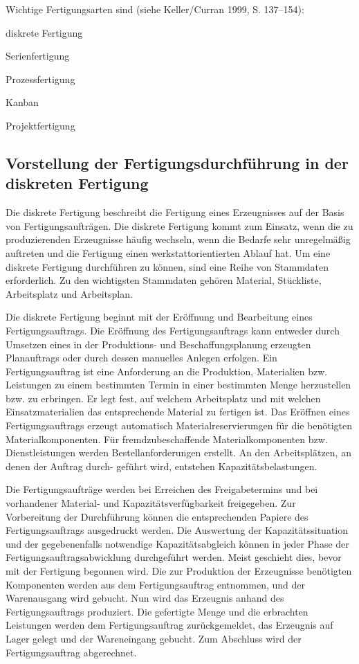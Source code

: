 Wichtige Fertigungsarten sind (siehe Keller/Curran 1999, S. 137–154): 

diskrete Fertigung 

Serienfertigung 

Prozessfertigung 

Kanban 

Projektfertigung



\subsection{Vorstellung der Fertigungsdurchführung in der diskreten Fertigung}


Die diskrete Fertigung  beschreibt die Fertigung eines Erzeugnisses auf der Basis von Fertigungsaufträgen. Die diskrete Fertigung kommt zum Einsatz, wenn die zu produzierenden Erzeugnisse häufig wechseln, wenn die Bedarfe sehr unregelmäßig auftreten und die Fertigung einen werkstattorientierten Ablauf hat. Um eine diskrete Fertigung durchführen zu können, sind eine Reihe von Stammdaten erforderlich. Zu den wichtigsten Stammdaten gehören Material, Stückliste, Arbeitsplatz und Arbeitsplan.

Die diskrete Fertigung beginnt mit der Eröffnung und Bearbeitung eines Fertigungsauftrags. Die Eröffnung des Fertigungsauftrags kann entweder durch Umsetzen eines in der Produktions- und Beschaffungsplanung erzeugten Planauftrags oder durch dessen manuelles Anlegen erfolgen. Ein Fertigungsauftrag ist eine Anforderung an die Produktion, Materialien bzw. Leistungen zu einem bestimmten Termin in einer bestimmten Menge herzustellen bzw. zu erbringen. Er legt fest, auf welchem Arbeitsplatz und mit welchen Einsatzmaterialien das entsprechende Material zu fertigen ist. Das Eröffnen eines Fertigungsauftrags erzeugt automatisch Materialreservierungen für die benötigten Materialkomponenten. Für fremdzubeschaffende Materialkomponenten bzw. Dienstleistungen werden Bestellanforderungen erstellt. An den Arbeitsplätzen, an denen der Auftrag durch- geführt wird, entstehen Kapazitätsbelastungen.

Die Fertigungsaufträge werden bei Erreichen des Freigabetermins und bei vorhandener Material- und Kapazitätsverfügbarkeit freigegeben. Zur Vorbereitung der Durchführung können die entsprechenden Papiere des Fertigungsauftrags ausgedruckt werden. Die Auswertung der Kapazitätssituation und der gegebenenfalls notwendige Kapazitätsabgleich können in jeder Phase der Fertigungsauftragsabwicklung durchgeführt werden. Meist geschieht dies, bevor mit der Fertigung begonnen wird. Die zur Produktion der Erzeugnisse benötigten Komponenten werden aus dem Fertigungsauftrag entnommen, und der Warenausgang wird gebucht. Nun wird das Erzeugnis anhand des Fertigungsauftrags produziert. Die gefertigte Menge und die erbrachten Leistungen werden dem Fertigungsauftrag zurückgemeldet, das Erzeugnis auf Lager gelegt und der Wareneingang gebucht. Zum Abschluss wird der Fertigungsauftrag abgerechnet.


